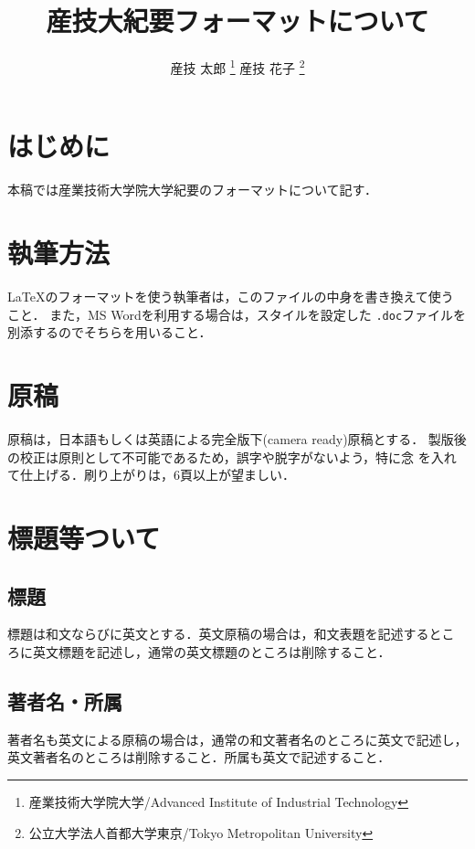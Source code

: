 \documentclass[a4j, 12Q, twocolumn, twoside]{jsarticle}
\title{産技大紀要フォーマットについて}
\author{
  産技 太郎
  \thanks{産業技術大学院大学/Advanced Institute of Industrial
  Technology}
  産技 花子
  \thanks{公立大学法人首都大学東京/Tokyo Metropolitan University}
}
\begin{document}
\maketitle[5pt]

\section{はじめに}
本稿では産業技術大学院大学紀要のフォーマットについて記す．

\section{執筆方法}
\LaTeX のフォーマットを使う執筆者は，このファイルの中身を書き換えて使う
こと．
%
また，MS Wordを利用する場合は，スタイルを設定した
\texttt{.doc}ファイルを別添するのでそちらを用いること．

\section{原稿}
原稿は，日本語もしくは英語による完全版下(camera ready)原稿とする．
製版後の校正は原則として不可能であるため，誤字や脱字がないよう，特に念
を入れて仕上げる．刷り上がりは，6頁以上が望ましい．

\section{標題等ついて}
\subsection{標題}
標題は和文ならびに英文とする．英文原稿の場合は，和文表題を記述するとこ
ろに英文標題を記述し，通常の英文標題のところは削除すること．

\subsection{著者名・所属}
著者名も英文による原稿の場合は，通常の和文著者名のところに英文で記述し，
英文著者名のところは削除すること．所属も英文で記述すること．
\end{document}
